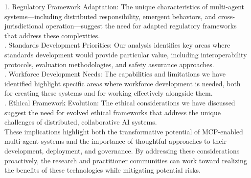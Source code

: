 1. Regulatory Framework Adaptation: The unique characteristics of multi-agent systems—including distributed responsibility, emergent behaviors, and cross-jurisdictional operation—suggest the need for adapted regulatory frameworks that address these complexities.\\ . Standards Development Priorities: Our analysis identifies key areas where standards development would provide particular value, including interoperability protocols, evaluation methodologies, and safety assurance approaches.\\ . Workforce Development Needs: The capabilities and limitations we have identified highlight specific areas where workforce development is needed, both for creating these systems and for working effectively alongside them.\\ . Ethical Framework Evolution: The ethical considerations we have discussed suggest the need for evolved ethical frameworks that address the unique challenges of distributed, collaborative AI systems.\\ \newline
These implications highlight both the transformative potential of MCP-enabled multi-agent systems and the importance of thoughtful approaches to their development, deployment, and governance. By addressing these considerations proactively, the research and practitioner communities can work toward realizing the benefits of these technologies while mitigating potential risks.\\
